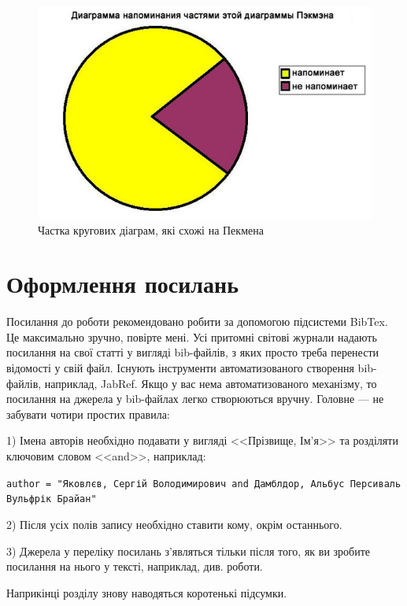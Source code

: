 \begin{figure}[ht]
    \centering
    \includegraphics[scale=0.5]{Images/Pacman.jpg}
    \caption{Частка кругових діаграм, які схожі на Пекмена}
    \label{fig_pacman}
\end{figure}

\section{Оформлення посилань}

Посилання до роботи рекомендовано робити за допомогою підсистеми BibTex.
Це максимально зручно, повірте мені. Усі притомні світові журнали надають
посилання на свої статті у вигляді bib-файлів, з яких просто треба
перенести відомості у свій файл. Існують інструменти автоматизованого створення bib-файлів, наприклад, JabRef.
Якщо у вас нема автоматизованого механізму, то посилання на джерела у
bib-файлах легко створюються вручну. Головне --- не забувати чотири простих
правила:

1) Імена авторів необхідно подавати у вигляді <<Прізвище, Ім'я>> та
розділяти ключовим словом <<and>>, наприклад:

\texttt{author = "Яковлєв, Сергій Володимирович and Дамблдор, Альбус Персиваль Вульфрік Брайан"}

2) Після усіх полів запису необхідно ставити кому, окрім останнього.

3) Джерела у переліку посилань з'являться тільки після того, як ви зробите
посилання на нього у тексті, наприклад, див. роботи.

\chapconclude{\ref{chap:theory}}

Наприкінці розділу знову наводяться коротенькі підсумки.